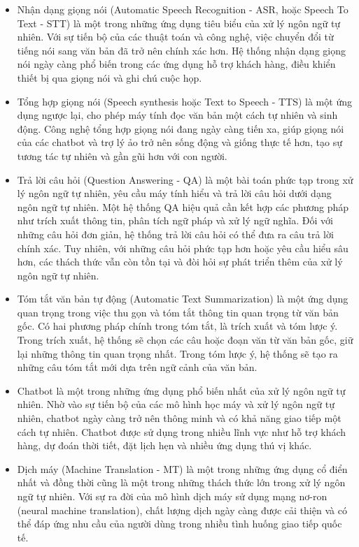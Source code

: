 \begin{itemize}
    \item Nhận dạng giọng nói (Automatic Speech Recognition - ASR, hoặc Speech To Text - STT) là một trong những ứng dụng tiêu biểu của xử lý ngôn ngữ tự nhiên. Với sự tiến bộ của các thuật toán và công nghệ, việc chuyển đổi từ tiếng nói sang văn bản đã trở nên chính xác hơn. Hệ thống nhận dạng giọng nói ngày càng phổ biến trong các ứng dụng hỗ trợ khách hàng, điều khiển thiết bị qua giọng nói và ghi chú cuộc họp.
    \item Tổng hợp giọng nói (Speech synthesis hoặc Text to Speech - TTS) là một ứng dụng ngược lại, cho phép máy tính đọc văn bản một cách tự nhiên và sinh động. Công nghệ tổng hợp giọng nói đang ngày càng tiến xa, giúp giọng nói của các chatbot và trợ lý ảo trở nên sống động và giống thực tế hơn, tạo sự tương tác tự nhiên và gần gũi hơn với con người.
    \item Trả lời câu hỏi (Question Answering - QA) là một bài toán phức tạp trong xử lý ngôn ngữ tự nhiên, yêu cầu máy tính hiểu và trả lời câu hỏi dưới dạng ngôn ngữ tự nhiên. Một hệ thống QA hiệu quả cần kết hợp các phương pháp như trích xuất thông tin, phân tích ngữ pháp và xử lý ngữ nghĩa. Đối với những câu hỏi đơn giản, hệ thống trả lời câu hỏi có thể đưa ra câu trả lời chính xác. Tuy nhiên, với những câu hỏi phức tạp hơn hoặc yêu cầu hiểu sâu hơn, các thách thức vẫn còn tồn tại và đòi hỏi sự phát triển thêm của xử lý ngôn ngữ tự nhiên. 
    \item Tóm tắt văn bản tự động (Automatic Text Summarization) là một ứng dụng quan trọng trong việc thu gọn và tóm tắt thông tin quan trọng từ văn bản gốc. Có hai phương pháp chính trong tóm tắt, là trích xuất và tóm lược ý. Trong trích xuất, hệ thống sẽ chọn các câu hoặc đoạn văn từ văn bản gốc, giữ lại những thông tin quan trọng nhất. Trong tóm lược ý, hệ thống sẽ tạo ra những câu tóm tắt mới dựa trên ngữ cảnh của văn bản. 
    \item Chatbot là một trong những ứng dụng phổ biến nhất của xử lý ngôn ngữ tự nhiên. Nhờ vào sự tiến bộ của các mô hình học máy và xử lý ngôn ngữ tự nhiên, chatbot ngày càng trở nên thông minh và có khả năng giao tiếp một cách tự nhiên. Chatbot được sử dụng trong nhiều lĩnh vực như hỗ trợ khách hàng, dự đoán thời tiết, đặt lịch hẹn và nhiều ứng dụng thú vị khác. 
    \item Dịch máy (Machine Translation - MT) là một trong những ứng dụng cổ điển nhất và đồng thời cũng là một trong những thách thức lớn trong xử lý ngôn ngữ tự nhiên. Với sự ra đời của mô hình dịch máy sử dụng mạng nơ-ron (neural machine translation), chất lượng dịch ngày càng được cải thiện và có thể đáp ứng nhu cầu của người dùng trong nhiều tình huống giao tiếp quốc tế. 

\end{itemize}
